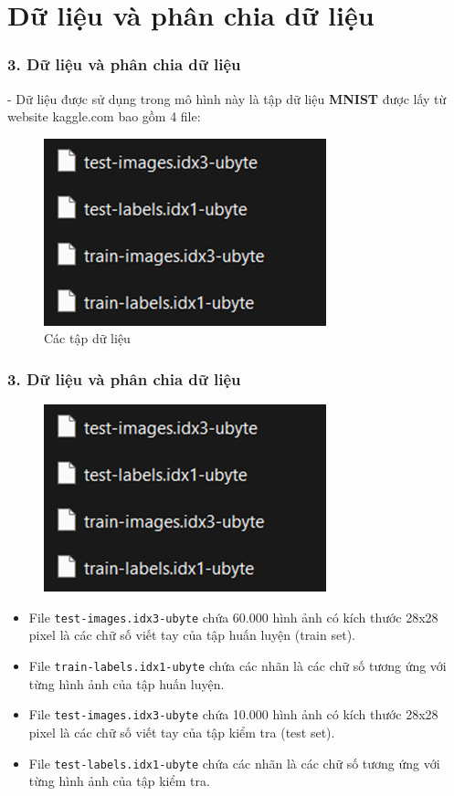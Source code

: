 \documentclass{beamer}
\begin{document}
\section{Dữ liệu và phân chia dữ liệu} 

\begin{frame}
\frametitle{3. Dữ liệu và phân chia dữ liệu}
- Dữ liệu được sử dụng trong mô hình này là tập dữ liệu \textbf{MNIST} được lấy từ website kaggle.com bao gồm 4 file:
\begin{figure}
    \centering
    \includegraphics[width=0.5\linewidth]{images/dataset.png}
    \caption{Các tập dữ liệu}
\end{figure}
\end{frame}

\begin{frame}
\frametitle{3. Dữ liệu và phân chia dữ liệu}
\begin{figure}
    \centering
    \includegraphics[width=0.3\linewidth]{images/dataset.png}
\end{figure}
    \begin{itemize}
    \item File \texttt{test-images.idx3-ubyte} chứa 60.000 hình ảnh có kích thước 28x28 pixel là các chữ số viết tay của tập huấn luyện (train set).
    \item File \texttt{train-labels.idx1-ubyte} chứa các nhãn là các chữ số tương ứng với từng hình ảnh của tập huấn luyện.
    \item File \texttt{test-images.idx3-ubyte} chứa 10.000 hình ảnh có kích thước 28x28 pixel là các chữ số viết tay của tập kiểm tra (test set).
    \item File \texttt{test-labels.idx1-ubyte} chứa các nhãn là các chữ số tương ứng với từng hình ảnh của tập kiểm tra.
\end{itemize}
\end{frame}
\end{document}
